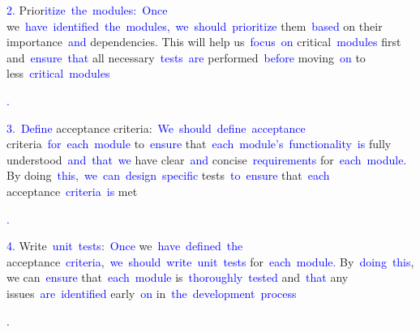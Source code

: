 \documentclass{article}
\begin{document}
\begin{tcolorbox}[colframe=black,colback=white]
{}\textcolor{blue}{2}\textcolor{blue}{.} Prior\textcolor{blue}{itize}\textcolor{blue}{~the}\textcolor{blue}{~modules}\textcolor{blue}{:}\textcolor{blue}{~Once} we\textcolor{blue}{~have}\textcolor{blue}{~identified}\textcolor{blue}{~the}\textcolor{blue}{~modules}\textcolor{blue}{,}\textcolor{blue}{~we}\textcolor{blue}{~should}\textcolor{blue}{~prioritize} them\textcolor{blue}{~based} on their importance\textcolor{blue}{~and} dependencies\textcolor{blue}{.} This will help us\textcolor{blue}{~focus}\textcolor{blue}{~on} critical\textcolor{blue}{~modules} first and\textcolor{blue}{~ensure}\textcolor{blue}{~that} all necessary\textcolor{blue}{~tests}\textcolor{blue}{~are} performed\textcolor{blue}{~before} moving\textcolor{blue}{~on} to less\textcolor{blue}{~critical}\textcolor{blue}{~modules}\textcolor{blue}{.

}\textcolor{blue}{3}\textcolor{blue}{.}\textcolor{blue}{~Define} acceptance criteria:\textcolor{blue}{~We}\textcolor{blue}{~should}\textcolor{blue}{~define}\textcolor{blue}{~acceptance} criteria\textcolor{blue}{~for}\textcolor{blue}{~each}\textcolor{blue}{~module} to\textcolor{blue}{~ensure} that\textcolor{blue}{~each}\textcolor{blue}{~module}\textcolor{blue}{'s}\textcolor{blue}{~functionality}\textcolor{blue}{~is} fully understood\textcolor{blue}{~and}\textcolor{blue}{~that}\textcolor{blue}{~we} have clear\textcolor{blue}{~and} concise\textcolor{blue}{~requirements} for\textcolor{blue}{~each}\textcolor{blue}{~module}\textcolor{blue}{.} By doing\textcolor{blue}{~this}\textcolor{blue}{,}\textcolor{blue}{~we}\textcolor{blue}{~can}\textcolor{blue}{~design}\textcolor{blue}{~specific} tests\textcolor{blue}{~to}\textcolor{blue}{~ensure} that\textcolor{blue}{~each} acceptance\textcolor{blue}{~criteria}\textcolor{blue}{~is} met\textcolor{blue}{.

}\textcolor{blue}{4}\textcolor{blue}{.} Write\textcolor{blue}{~unit}\textcolor{blue}{~tests}:\textcolor{blue}{~Once} we\textcolor{blue}{~have}\textcolor{blue}{~defined}\textcolor{blue}{~the} acceptance\textcolor{blue}{~criteria},\textcolor{blue}{~we}\textcolor{blue}{~should}\textcolor{blue}{~write}\textcolor{blue}{~unit}\textcolor{blue}{~tests} for\textcolor{blue}{~each}\textcolor{blue}{~module}\textcolor{blue}{.} By\textcolor{blue}{~doing}\textcolor{blue}{~this}, we can\textcolor{blue}{~ensure} that\textcolor{blue}{~each}\textcolor{blue}{~module} is\textcolor{blue}{~thoroughly}\textcolor{blue}{~tested} and\textcolor{blue}{~that} any issues\textcolor{blue}{~are}\textcolor{blue}{~identified} early\textcolor{blue}{~on} in\textcolor{blue}{~the}\textcolor{blue}{~development}\textcolor{blue}{~process}\textcolor{blue}{.

}
\end{tcolorbox}
\end{document}
